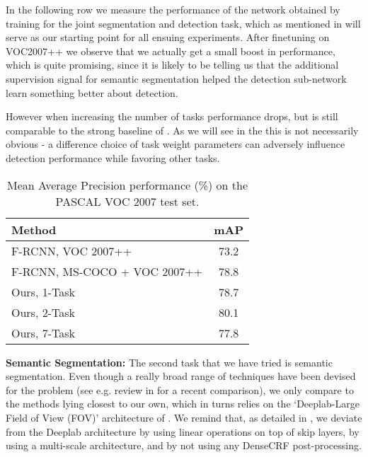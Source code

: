 \documentclass[10pt,twocolumn,letterpaper]{article}
\begin{document}
In the following row we measure the performance of the network obtained by training for the joint segmentation and detection task, which as mentioned in  will serve as our starting point for all ensuing experiments. 
  After finetuning on VOC2007++ we observe that we actually get a small boost in performance, which is quite promising, since it is likely to be telling us that the additional supervision signal for semantic segmentation helped the detection sub-network learn something better about detection. 
 
However when increasing the number of tasks  performance drops, but is still comparable to the strong baseline of \cite{Girshick15}. As we will see in the  this is not necessarily obvious - a difference choice of task weight parameters  can adversely influence detection performance while favoring  other tasks. 

\begin{table}[!h]

		\begin{tabular}{|l|c|}
			\hline
		Method	&	mAP \\\hline\hline
			F-RCNN, \cite{Girshick15} VOC 2007++  & 73.2\\\hline
			F-RCNN, \cite{Girshick15} MS-COCO +  VOC 2007++  & 
			78.8\\\hline	
			Ours, 1-Task & 78.7 \\\hline
			Ours, 2-Task & 80.1 \\\hline
			Ours, 7-Task & 77.8 \\\hline
		\end{tabular}
	\caption{Mean Average Precision performance (\%) on the PASCAL VOC 2007 test set.}
	\label{table:results_ap}
\end{table}

\textbf{Semantic Segmentation:} The second task that we have tried is semantic segmentation. Even though a really broad range of techniques have been devised for the problem (see e.g. review in \cite{ChenPK0Y16} for a recent comparison), we only compare to the  methods lying closest to our own, which in turns relies on the `Deeplab-Large Field of View (FOV)' architecture of \cite{Chen2015iclr}. We remind that, as detailed in , we deviate from the Deeplab architecture by using linear operations on top of skip layers, by using a multi-scale architecture, and by not using any DenseCRF post-processing.
 
\end{document}

